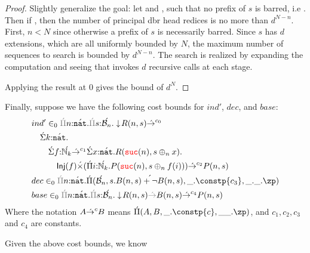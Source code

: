\begin{proof}
  Slightly generalize the goal: let  and , such that 
  no prefix of $s$ is barred, i.e .
  Then if ,
  then the number of principal dbr head redices is no more than $d^{N - n}$. 
  First, $n < N$ since otherwise a prefix of $s$ is necessarily barred. 
  Since $s$ has $d$ extensions, which are all uniformly bounded by $N$, the maximum number of 
  sequences to search is bounded by $d^{N-n}$. The search is realized by expanding the computation and seeing 
  that  invokes $d$ recursive calls at each stage. 

  Applying the result at 0 gives the bound of $d^N$.
\end{proof}

Finally, suppose we have the following cost bounds for $ind'$, $dec$, and $base$:
\begin{align*}
&\isVal{ind'}{\pityzc{\isOf{n}{\lift{\nat}}}{\pityzc{\isOf{s}{\lift{\nseq{n}}}}
    {\squash{R(n,s)} \tolrc{c_0} \\
      &\quad\sigmatyc{\isOf{k}{\lift{\nat}}}{\\
        &\quad\quad\sigmatyc{\isOf{f}{\lift{\N_k} \tolrc{c_1}
        \sigmatyc{\isOf{x}{\lift{\nat}}}{R(\suc{n},s \oplus_n x)}}}{\\
      &\quad\quad\quad\Inj{f} \lift{\times} 
        (\pityc{\isOf{i}{\lift{\N_k}}}{P(\suc{n}, s \oplus_n f(i))}}) \tolrc{c_2} P(n,s)}}}}\\
    &\isVal{dec}{\pityzc{\isOf{n}{\lift{\nat}}}{\arrabtc{\lift{\nseq{n}}}
    {s.\lift{B(n,s) + \neg B(n,s)}}{\_.\constp{c_3},\_.\_.\zp}}}\\
    &\isVal{base}{\pityzc{\isOf{n}{\lift{\nat}}}{\pityzc{\isOf{s}{\lift{\nseq{n}}}}{\squash{R(n,s)} \tolrz 
    B(n,s) \tolrc{c_4} P(n,s)}}}\\
\end{align*}
Where the notation $A {\acute{\to}}^{c} B$ means $\arrabtc{A}{B}{\_.\constp{c},\_\_.\zp}$, and $c_1, c_2, c_3$ and $c_4$
are constants. 

\begin{lemma}
  Given the above cost bounds, we know 
\end{lemma}


